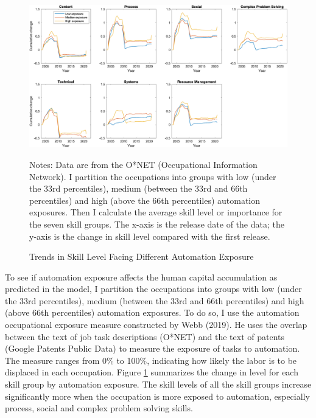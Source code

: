 \documentclass[12pt]{article}
\begin{document}
\begin{appendices}
\begin{figure}[h!]
\includegraphics[width = \textwidth]{LV_trend1}
\caption{Trends in Skill Level Facing Different Automation Exposure}
\label{LV_trend1}
{\scriptsize Notes: Data are from the O*NET (Occupational Information Network). I partition the occupations into groups with low (under the 33rd percentiles), medium (between the 33rd and 66th percentiles) and high (above the 66th percentiles) automation exposures. Then I calculate the average skill level or importance for the seven skill groups. The x-axis is the release date of the data; the y-axis is the change in skill level compared with the first release. }
\end{figure}

To see if automation exposure affects the human capital accumulation as predicted in the model, I partition the occupations into groups with low (under the 33rd percentiles), medium (between the 33rd and 66th percentiles) and high (above 66th percentiles) automation exposures. To do so, I use the automation occupational exposure measure constructed by Webb (2019)\nocite{Webb2019}. He uses the overlap between the text of job task descriptions (O*NET) and the text of patents (Google Patents Public Data) to measure the exposure of tasks to automation. The measure ranges from 0\% to 100\%, indicating how likely the labor is to be displaced in each occupation. Figure \ref{LV_trend1} summarizes the change in level for each skill group by automation exposure. The skill levels of all the skill groups increase significantly more when the occupation is more exposed to automation, especially process, social and complex problem solving skills. 


\end{appendices}
\end{document}
